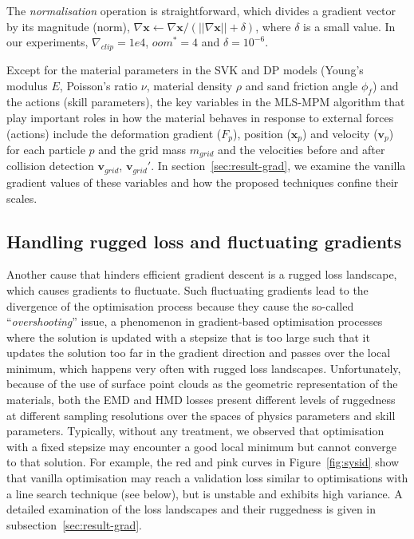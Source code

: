\documentclass[letterpaper, 10 pt, journal, twoside]{ieeetran}
\begin{document}
The \textit{normalisation} operation is straightforward, which divides a gradient vector by its magnitude (norm), $\nabla \pmb{x}\leftarrow \nabla\pmb{x}/(||\nabla\pmb{x}|| +\delta)$, where $\delta$ is a small value. In our experiments, $\nabla_{clip} = 1e4$, $oom^*=4$ and $\delta=10^{-6}$. 

Except for the material parameters in the SVK and DP models (Young's modulus $E$, Poisson's ratio $\nu$, material density $\rho$ and sand friction angle $\phi_f$) and the actions (skill parameters), the key variables in the MLS-MPM algorithm that play important roles in how the material behaves in response to external forces (actions) include the deformation gradient ($F_p$), position ($\pmb{x}_p$) and velocity ($\pmb{v}_p$) for each particle $p$ and the grid mass $m_{grid}$ and the velocities before and after collision detection $\pmb{v}_{grid}$, $\pmb{v}_{grid}'$. In section~\ref{sec:result-grad}, we examine the vanilla gradient values of these variables and how the proposed techniques confine their scales.
 
\subsection{Handling rugged loss and fluctuating gradients}\label{subsec:grad-fluctuate}

Another cause that hinders efficient gradient descent is a rugged loss landscape, which causes gradients to fluctuate. Such fluctuating gradients lead to the divergence of the optimisation process because they cause the so-called ``\textit{overshooting}'' issue, a phenomenon in gradient-based optimisation processes where the solution is updated with a stepsize that is too large such that it updates the solution too far in the gradient direction and passes over the local minimum, which happens very often with rugged loss landscapes. Unfortunately, because of the use of surface point clouds as the geometric representation of the materials, both the EMD and HMD losses present different levels of ruggedness at different sampling resolutions over the spaces of physics parameters and skill parameters. Typically, without any treatment, we observed that optimisation with a fixed stepsize may encounter a good local minimum but cannot converge to that solution. For example, the red and pink curves in Figure~\ref{fig:sysid} show that vanilla optimisation may reach a validation loss similar to optimisations with a line search technique (see below), but is unstable and exhibits high variance. A detailed examination of the loss landscapes and their ruggedness is given in subsection~\ref{sec:result-grad}.
\end{document}

